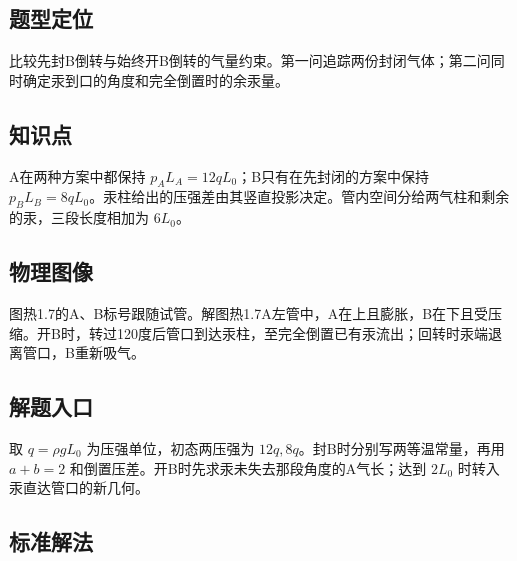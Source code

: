 \documentclass[UTF8,fontset=fandol,a4paper,11pt]{ctexart}
\begin{document}


\subsection*{题型定位}

比较先封B倒转与始终开B倒转的气量约束。第一问追踪两份封闭气体；第二问同时确定汞到口的角度和完全倒置时的余汞量。



\subsection*{知识点}

A在两种方案中都保持 $p_AL_A=12qL_0$；B只有在先封闭的方案中保持 $p_BL_B=8qL_0$。汞柱给出的压强差由其竖直投影决定。管内空间分给两气柱和剩余的汞，三段长度相加为 $6L_0$。



\subsection*{物理图像}

图热1.7的A、B标号跟随试管。解图热1.7A左管中，A在上且膨胀，B在下且受压缩。开B时，转过120度后管口到达汞柱，至完全倒置已有汞流出；回转时汞端退离管口，B重新吸气。



\subsection*{解题入口}

取 $q=\rho gL_0$ 为压强单位，初态两压强为 $12q,8q$。封B时分别写两等温常量，再用 $a+b=2$ 和倒置压差。开B时先求汞未失去那段角度的A气长；达到 $2L_0$ 时转入汞直达管口的新几何。



\subsection*{标准解法}
\end{document}
